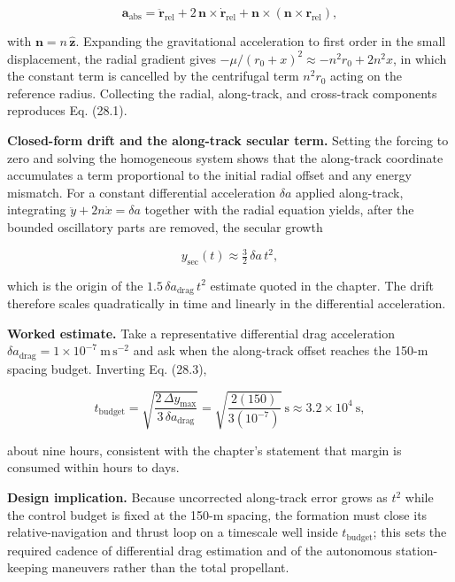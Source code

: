 \documentclass[
  11pt,
  openany,
  oneside]{book}
\begin{document}
\begin{equation}
\mathbf{a}_{\mathrm{abs}} = \ddot{\mathbf{r}}_{\mathrm{rel}} + 2\,\mathbf{n}\times\dot{\mathbf{r}}_{\mathrm{rel}} + \mathbf{n}\times(\mathbf{n}\times\mathbf{r}_{\mathrm{rel}}), \tag{28.2}
\end{equation}

with \(\mathbf{n} = n\,\hat{\mathbf{z}}\). Expanding the gravitational
acceleration to first order in the small displacement, the radial
gradient gives \(-\mu/(r_0+x)^2 \approx -n^2 r_0 + 2 n^2 x\), in which
the constant term is cancelled by the centrifugal term \(n^2 r_0\)
acting on the reference radius. Collecting the radial, along-track, and
cross-track components reproduces Eq. (28.1).

\textbf{Closed-form drift and the along-track secular term.} Setting the
forcing to zero and solving the homogeneous system shows that the
along-track coordinate accumulates a term proportional to the initial
radial offset and any energy mismatch. For a constant differential
acceleration \(\delta a\) applied along-track, integrating
\(\ddot y + 2 n \dot x = \delta a\) together with the radial equation
yields, after the bounded oscillatory parts are removed, the secular
growth

\begin{equation}
y_{\mathrm{sec}}(t) \approx \tfrac{3}{2}\,\delta a\, t^2, \tag{28.3}
\end{equation}

which is the origin of the \(1.5\,\delta a_{\mathrm{drag}}\, t^2\)
estimate quoted in the chapter. The drift therefore scales quadratically
in time and linearly in the differential acceleration.

\textbf{Worked estimate.} Take a representative differential drag
acceleration
\(\delta a_{\mathrm{drag}} = 1\times 10^{-7}\ \mathrm{m\,s^{-2}}\) and
ask when the along-track offset reaches the 150-m spacing budget.
Inverting Eq. (28.3),

\begin{equation}
t_{\mathrm{budget}} = \sqrt{\frac{2\,\Delta y_{\max}}{3\,\delta a_{\mathrm{drag}}}} = \sqrt{\frac{2(150)}{3(10^{-7})}}\ \mathrm{s} \approx 3.2\times 10^{4}\ \mathrm{s}, \tag{28.4}
\end{equation}

about nine hours, consistent with the chapter's statement that margin is
consumed within hours to days.

\textbf{Design implication.} Because uncorrected along-track error grows
as \(t^2\) while the control budget is fixed at the 150-m spacing, the
formation must close its relative-navigation and thrust loop on a
timescale well inside \(t_{\mathrm{budget}}\); this sets the required
cadence of differential drag estimation and of the autonomous
station-keeping maneuvers rather than the total propellant.
\end{document}
